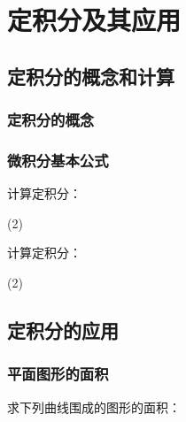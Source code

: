 \chapter{定积分及其应用}
\section{定积分的概念和计算}

\subsection{定积分的概念}
\begin{Practice}
  \begin{question}
    \item 
    \item 
  \end{question}
\end{Practice}

\subsection{微积分基本公式}
\begin{Practice}
  计算定积分：
  \begin{tasks}(2)
    \task
    \task
    \task
    \task
    \task
    \task
    \task
    \task
    \task
    \task
  \end{tasks}
\end{Practice}

\begin{Exercise}
  计算定积分：
  \begin{tasks}(2)
    \task
    \task
    \task
    \task
    \task
    \task
    \task
    \task
    \task
    \task
    \task
    \task
    \task
    \task
  \end{tasks}
\end{Exercise}

\section{定积分的应用}
\subsection{平面图形的面积}
\begin{Practice}
  求下列曲线围成的图形的面积：
  \begin{tasks}
    \task 
    \task 
    \task 
    \task 
    \task 
  \end{tasks}
\end{Practice}

